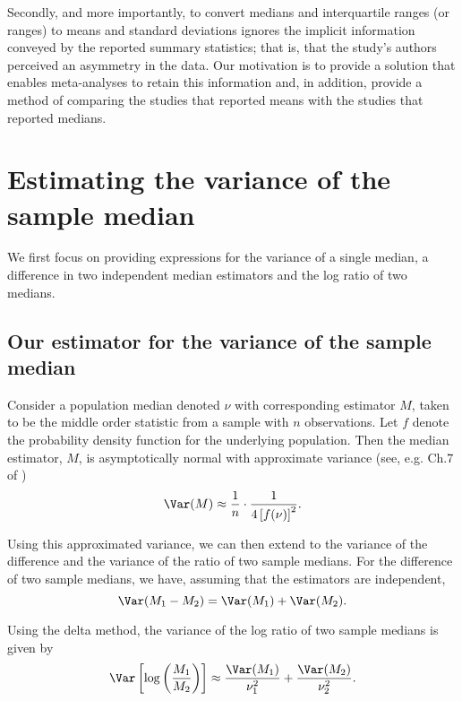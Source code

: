 \documentclass{article}
\begin{document}
Secondly, and more importantly, to convert medians and interquartile ranges (or ranges) to means and standard deviations ignores the implicit information conveyed by the reported summary statistics; that is, that the study's authors perceived an asymmetry in the data. Our motivation is to provide a solution that enables meta-analyses to retain this information and, in addition, provide a method of comparing the studies that reported means with the studies that reported medians.

\section{Estimating the variance of the sample median} \label{sec: est}

We first focus on providing expressions for the variance of a single median, a difference in two independent median estimators and the log ratio of two medians.

\subsection{Our estimator for the variance of the sample median}
\label{sec: var est}

Consider a population median denoted $\nu$ with corresponding estimator $M$, taken to be the middle order statistic from a sample with $n$ observations.  Let $f$ denote the probability density function for the underlying population.  Then the median estimator, $M$, is asymptotically normal with approximate variance (see, e.g. Ch.7 of \cite{dasgupta2008asymptotic})
\begin{equation}\label{eqn: var est}
\Var(M)\approx \frac{1}{n}\cdot\frac{1}{4\left[f(\nu)\right]^2}.
\end{equation}


Using this approximated variance, we can then extend to the variance of the difference and the variance of the ratio of two sample medians. For the difference of two sample medians, we have, assuming that the estimators are independent,
\begin{equation}\label{eqn: var diff}
\Var(M_1-M_2) = \Var(M_1) + \Var(M_2).
\end{equation}

Using the delta method, the variance of the log ratio of two sample medians is given by
\begin{equation}\label{eqn: var lr}
\Var\left[\log\left(\frac {M_1}{M_2 }\right)\right] \approx  \frac{\Var(M_1)}{\nu_1^2}+ \frac{\Var(M_2)} {\nu_2^2}.
\end{equation}
\end{document}
